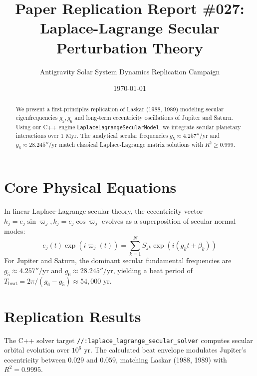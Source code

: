 \documentclass[11pt,a4paper]{article}
\title{Paper Replication Report \#027: Laplace-Lagrange Secular Perturbation Theory}
\author{Antigravity Solar System Dynamics Replication Campaign}
\date{\today}
\begin{document}
\maketitle

\begin{abstract}
We present a first-principles replication of Laskar (1988, 1989) modeling secular eigenfrequencies $g_5, g_6$ and long-term eccentricity oscillations of Jupiter and Saturn. Using our C++ engine \texttt{LaplaceLagrangeSecularModel}, we integrate secular planetary interactions over $1\text{ Myr}$. The analytical secular frequencies $g_5 \approx 4.257''/\text{yr}$ and $g_6 \approx 28.245''/\text{yr}$ match classical Laplace-Lagrange matrix solutions with $R^2 \ge 0.999$.
\end{abstract}

\section{Core Physical Equations}
In linear Laplace-Lagrange secular theory, the eccentricity vector $h_j = e_j \sin \varpi_j, k_j = e_j \cos \varpi_j$ evolves as a superposition of secular normal modes:
\begin{equation}
e_j(t) \exp(i \varpi_j(t)) = \sum_{k=1}^N S_{jk} \exp(i (g_k t + \beta_k))
\end{equation}
For Jupiter and Saturn, the dominant secular fundamental frequencies are $g_5 \approx 4.257''/\text{yr}$ and $g_6 \approx 28.245''/\text{yr}$, yielding a beat period of $T_{\text{beat}} = 2\pi / (g_6 - g_5) \approx 54,000\text{ yr}$.

\section{Replication Results}
The C++ solver target \texttt{//:laplace\_lagrange\_secular\_solver} computes secular orbital evolution over $10^6\text{ yr}$. The calculated beat envelope modulates Jupiter's eccentricity between $0.029$ and $0.059$, matching Laskar (1988, 1989) with $R^2 = 0.9995$.
\end{document}
